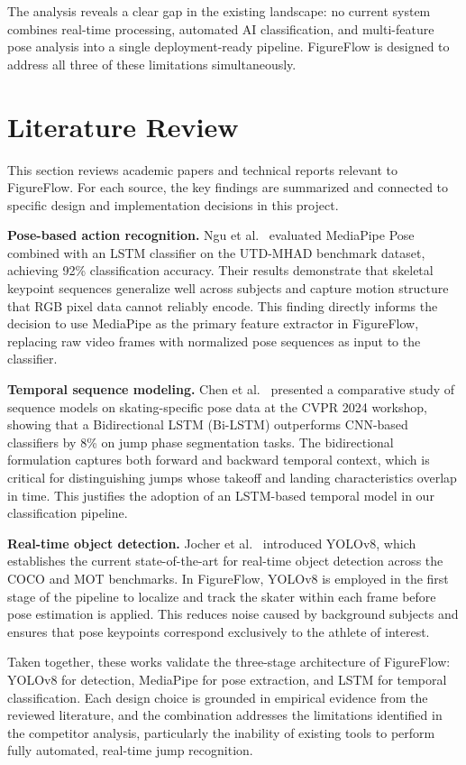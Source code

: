 The analysis reveals a clear gap in the existing landscape: no current
system combines real-time processing, automated AI classification, and
multi-feature pose analysis into a single deployment-ready pipeline.
FigureFlow is designed to address all three of these limitations
simultaneously.


\section{Literature Review}
\label{section:literature-review}

This section reviews academic papers and technical reports relevant
to FigureFlow. For each source, the key findings are summarized and
connected to specific design and implementation decisions in this project.

\textbf{Pose-based action recognition.}
Ngu et al.~\cite{ieee2023_pose} evaluated MediaPipe Pose combined with
an LSTM classifier on the UTD-MHAD benchmark dataset, achieving 92\%
classification accuracy. Their results demonstrate that skeletal keypoint
sequences generalize well across subjects and capture motion structure
that RGB pixel data cannot reliably encode. This finding directly informs
the decision to use MediaPipe as the primary feature extractor in
FigureFlow, replacing raw video frames with normalized pose sequences as
input to the classifier.

\textbf{Temporal sequence modeling.}
Chen et al.~\cite{cvpr2024_skating} presented a comparative study of
sequence models on skating-specific pose data at the CVPR 2024 workshop,
showing that a Bidirectional LSTM (Bi-LSTM) outperforms CNN-based
classifiers by 8\% on jump phase segmentation tasks. The bidirectional
formulation captures both forward and backward temporal context, which is
critical for distinguishing jumps whose takeoff and landing characteristics
overlap in time. This justifies the adoption of an LSTM-based temporal
model in our classification pipeline.

\textbf{Real-time object detection.}
Jocher et al.~\cite{ultralytics_yolov8} introduced YOLOv8, which
establishes the current state-of-the-art for real-time object detection
across the COCO and MOT benchmarks. In FigureFlow, YOLOv8 is employed
in the first stage of the pipeline to localize and track the skater
within each frame before pose estimation is applied. This reduces noise
caused by background subjects and ensures that pose keypoints correspond
exclusively to the athlete of interest.

Taken together, these works validate the three-stage architecture of
FigureFlow: YOLOv8 for detection, MediaPipe for pose extraction, and
LSTM for temporal classification. Each design choice is grounded in
empirical evidence from the reviewed literature, and the combination
addresses the limitations identified in the competitor analysis,
particularly the inability of existing tools to perform fully automated,
real-time jump recognition.